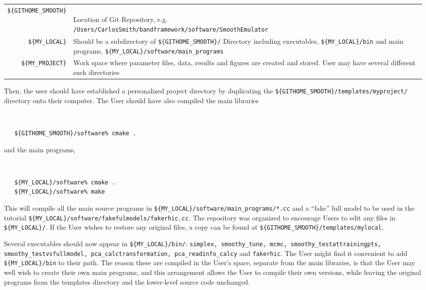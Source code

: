 \documentclass[UserManual.tex]{subfiles}
\begin{document}
\begin{tabular}{rl}\hline
{\tt \$\{GITHOME\_SMOOTH\}} & \parbox{5in}{~\\Location of Git Repository, e.g.\\{\tt /Users/CarlosSmith/bandframework/software/SmoothEmulator}\\}\\
{\tt \$\{MY\_LOCAL\}} & \parbox{5in}{Should be a subdirectory of {\tt \$\{GITHOME\_SMOOTH\}/}\\
Directory including executables, {\tt \$\{MY\_LOCAL\}/bin}\\and main programs, {\tt \$\{MY\_LOCAL\}/software/main\_programs}\\}\\
{\tt \$\{MY\_PROJECT\}} & \parbox{5in}{Work space where parameter files, data, results and figures are created and stored. User may have several different such directories}\\ \hline
\end{tabular}

Then, the user should have established a personalized project directory by duplicating the {\tt \$\{GITHOME\_SMOOTH\}/templates/myproject/} directory onto their computer. The User should have also compiled the main libraries
{\tt
\begin{verbatim}
   ${GITHOME_SMOOTH}/software% cmake .
\end{verbatim}
}
and the main programs,
{\tt
\begin{verbatim}
   ${MY_LOCAL}/software% cmake .
   ${MY_LOCAL}/software% make
\end{verbatim}
}
This will compile all the main source programs in {\tt \$\{MY\_LOCAL\}/software/main\_programs/*.cc} and a ``fake'' full model to be used in the tutorial {\tt \$\{MY\_LOCAL\}/software/fakefulmodels/fakerhic.cc}. The repository was organized to encourage Users to edit any files in {\tt \$\{MY\_LOCAL\}/}. If the User wishes to restore any original files, a copy can be found at {\tt \$\{GITHOME\_SMOOTH\}/templates/mylocal}.

Several executables should now appear in {\tt \$\{MY\_LOCAL\}/bin/}: {\tt simplex, smoothy\_tune, mcmc, smoothy\_testattrainingpts, smoothy\_testvsfullmodel, pca\_calctransformation, pca\_readinfo\_calcy} and {\tt fakerhic}. The User might find it convenient to add {\tt \$\{MY\_LOCAL\}/bin} to their path. The reason these are compiled in the User's space, separate from the main libraries, is that the User may well wish to create their own main programs, and this arrangement allows the User to compile their own versions, while leaving the original programs from the templates directory and the lower-level source code unchanged. 
\end{document}
